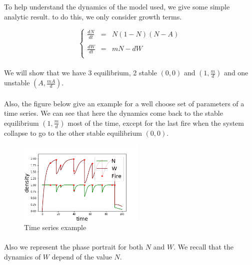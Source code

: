 \documentclass{article}
\begin{document}
To help understand the dynamics of the model used, we give some simple analytic result. to do this, we only consider growth terms.

\[ %
\left\lbrace
\begin{array}{rcl}
\frac{dN}{dt} & = & N(1-N)(N-A) \\
\\
\frac{dW}{dt} & = & mN -dW \\
\end{array}
\right.
\]


\paragraph{}
We will show that we have 3 equilibrium, 2 stable $(0, 0)$ and $(1, \frac{m}{d})$ and one unstable $(A, \frac{mA}{d})$.

\paragraph{}
Also, the figure below give an example for a well choose set of parameters of a time series. We can see that here the dynamics come back to the stable equilibrium $(1, \frac{m}{d})$ most of the time, except for the last fire when the system collapse to go to the other stable equilibrium $(0, 0)$. %

\begin{figure}[h!]
\centering
\includegraphics[width=6cm]{return_between_2.png}
\caption{Time series example}
\end{figure}


\paragraph{}
Also we represent the phase portrait for both $N$ and $W$. We recall that the dynamics of $W$ depend of the value $N$. 
\end{document}
